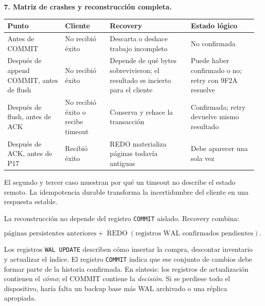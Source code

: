 \documentclass[variant=guiaresuelta,cover=institutional,mode=screen]{ua-engineering-v6-article}
\begin{document}
\begin{uaexercise}
\textbf{7. Matriz de crashes y reconstrucción completa.}
\end{uaexercise}
\begin{uaanswer}
\begin{center}
\small
\begin{tabular}{p{}p{}p{}p{}}
\toprule
Punto & Cliente & Recovery & Estado lógico \\
\midrule
Antes de COMMIT & No recibió éxito & Descarta o deshace trabajo incompleto & No confirmada \\
Después de append COMMIT, antes de flush & No recibió éxito & Depende de qué bytes sobrevivieron; el resultado es incierto para el cliente & Puede haber confirmado o no; retry con 9F2A resuelve \\
Después de flush, antes de ACK & No recibió éxito o recibe timeout & Conserva y rehace la transacción & Confirmada; retry devuelve mismo resultado \\
Después de ACK, antes de P17 & Recibió éxito & REDO materializa páginas todavía antiguas & Debe aparecer una sola vez \\
\bottomrule
\end{tabular}
\end{center}

El segundo y tercer caso muestran por qué un timeout no describe el estado remoto. La idempotencia durable transforma la incertidumbre del cliente en una respuesta estable.

La reconstrucción no depende del registro \texttt{COMMIT} aislado. Recovery combina:

\[
\text{páginas persistentes anteriores}
+
\operatorname{REDO}(\text{registros WAL confirmados pendientes}).
\]

Los registros \texttt{WAL UPDATE} describen cómo insertar la compra, descontar inventario y actualizar el índice. El registro \texttt{COMMIT} indica que ese conjunto de cambios debe formar parte de la historia confirmada. En síntesis: los registros de actualización contienen el \emph{cómo}; el COMMIT contiene la \emph{decisión}. Si se perdiese todo el dispositivo, haría falta un backup base más WAL archivado o una réplica apropiada.
\end{uaanswer}
\end{document}
